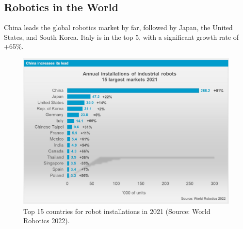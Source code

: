 \hfill

\subsection{Robotics in the World}

China leads the global robotics market by far, followed by Japan, the United States, and South Korea. Italy is in the top 5, with a significant growth rate of +65\%.

\begin{figure}[H]
  \centering
  \includegraphics[width=0.85\linewidth]{imgs/robotics_by_country.png}
  \caption{Top 15 countries for robot installations in 2021 (Source: World Robotics 2022).}
\end{figure}

\newpage